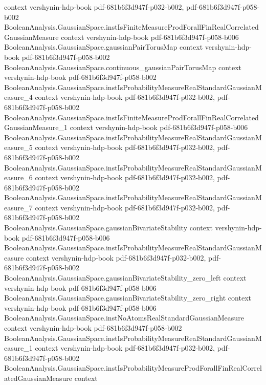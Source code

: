 \begin{theorem}
  {context}
  {vershynin-hdp-book}
  {pdf-681b6f3d947f-p032-b002,
    pdf-681b6f3d947f-p058-b002}
\proofstep
  {BooleanAnalysis.GaussianSpace.instIsFiniteMeasureProdForallFinRealCorrelatedGaussianMeasure}
  {context}
  {vershynin-hdp-book}
  {pdf-681b6f3d947f-p058-b006}
\proofstep
  {BooleanAnalysis.GaussianSpace.gaussianPairTorusMap}
  {context}
  {vershynin-hdp-book}
  {pdf-681b6f3d947f-p058-b002}
\proofstep
  {BooleanAnalysis.GaussianSpace.continuous_gaussianPairTorusMap}
  {context}
  {vershynin-hdp-book}
  {pdf-681b6f3d947f-p058-b002}
\proofstep
  {BooleanAnalysis.GaussianSpace.instIsProbabilityMeasureRealStandardGaussianMeasure_4}
  {context}
  {vershynin-hdp-book}
  {pdf-681b6f3d947f-p032-b002,
    pdf-681b6f3d947f-p058-b002}
\proofstep
  {BooleanAnalysis.GaussianSpace.instIsFiniteMeasureProdForallFinRealCorrelatedGaussianMeasure_1}
  {context}
  {vershynin-hdp-book}
  {pdf-681b6f3d947f-p058-b006}
\proofstep
  {BooleanAnalysis.GaussianSpace.instIsProbabilityMeasureRealStandardGaussianMeasure_5}
  {context}
  {vershynin-hdp-book}
  {pdf-681b6f3d947f-p032-b002,
    pdf-681b6f3d947f-p058-b002}
\proofstep
  {BooleanAnalysis.GaussianSpace.instIsProbabilityMeasureRealStandardGaussianMeasure_6}
  {context}
  {vershynin-hdp-book}
  {pdf-681b6f3d947f-p032-b002,
    pdf-681b6f3d947f-p058-b002}
\proofstep
  {BooleanAnalysis.GaussianSpace.instIsProbabilityMeasureRealStandardGaussianMeasure_7}
  {context}
  {vershynin-hdp-book}
  {pdf-681b6f3d947f-p032-b002,
    pdf-681b6f3d947f-p058-b002}
\proofstep
  {BooleanAnalysis.GaussianSpace.gaussianBivariateStability}
  {context}
  {vershynin-hdp-book}
  {pdf-681b6f3d947f-p058-b006}
\proofstep
  {BooleanAnalysis.GaussianSpace.instIsProbabilityMeasureRealStandardGaussianMeasure}
  {context}
  {vershynin-hdp-book}
  {pdf-681b6f3d947f-p032-b002,
    pdf-681b6f3d947f-p058-b002}
\proofstep
  {BooleanAnalysis.GaussianSpace.gaussianBivariateStability_zero_left}
  {context}
  {vershynin-hdp-book}
  {pdf-681b6f3d947f-p058-b006}
\proofstep
  {BooleanAnalysis.GaussianSpace.gaussianBivariateStability_zero_right}
  {context}
  {vershynin-hdp-book}
  {pdf-681b6f3d947f-p058-b006}
\proofstep
  {BooleanAnalysis.GaussianSpace.instNoAtomsRealStandardGaussianMeasure}
  {context}
  {vershynin-hdp-book}
  {pdf-681b6f3d947f-p058-b002}
\proofstep
  {BooleanAnalysis.GaussianSpace.instIsProbabilityMeasureRealStandardGaussianMeasure_1}
  {context}
  {vershynin-hdp-book}
  {pdf-681b6f3d947f-p032-b002,
    pdf-681b6f3d947f-p058-b002}
\proofstep
  {BooleanAnalysis.GaussianSpace.instIsProbabilityMeasureProdForallFinRealCorrelatedGaussianMeasure}
  {context}

\end{theorem}
